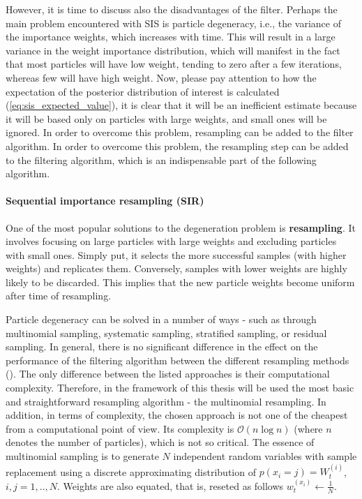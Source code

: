 However, it is time to discuss also the disadvantages of the filter. Perhaps the main problem encountered with SIS is particle degeneracy, i.e., the variance of the importance weights, which increases with time. This will result in a large variance in the weight importance distribution, which will manifest in the fact that most particles will have low weight, tending to zero after a few iterations, whereas few will have high weight. Now, please pay attention to how the expectation of the posterior distribution of interest is calculated (\ref{eq:sis_expected_value}), it is clear that it will be an inefficient estimate because it will be based only on particles with large weights, and small ones will be ignored. In order to overcome this problem, resampling can be added to the filter algorithm. In order to overcome this problem, the resampling step can be added to the filtering algorithm, which is an indispensable part of the following algorithm.

\paragraph*{Sequential importance resampling (SIR)}
One of the most popular solutions to the degeneration problem is \textbf{resampling}. It involves focusing on large particles with large weights and excluding particles with small ones. Simply put, it selects the more successful samples (with higher weights) and replicates them. Conversely, samples with lower weights are highly likely to be discarded. 
This implies that the new particle weights become uniform after time of resampling.

Particle degeneracy can be solved in a number of ways - such as through multinomial sampling,  systematic sampling, stratified sampling, or residual sampling. In general, there is no significant difference in the effect on the performance of the filtering algorithm between the different resampling methods (\cite{li_resampling_2015}). The only difference between the listed approaches is their computational complexity. Therefore, in the framework of this thesis will be used the most basic and straightforward resampling algorithm - the multinomial resampling. In addition, in terms of complexity, the chosen approach is not one of the cheapest from a computational point of view. Its complexity is \(\mathcal{O}(n \log n)\) (where \(n\) denotes the number of particles), which is not so critical. The essence of multinomial sampling is to generate \(N\) independent random variables with sample replacement using a discrete approximating distribution of \(p(x_i = j) = W_t^{(i)}\), \(i,j=1,..,N\). Weights are also equated, that is, reseted as follows \(w_t^{\left(x_i\right)} \leftarrow \frac{1}{N}\).

